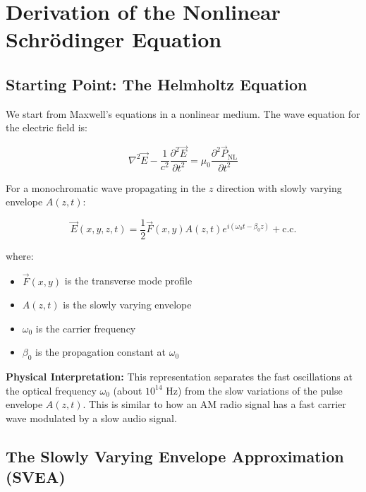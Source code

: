 \documentclass[a4paper, 11pt]{article}
\begin{document}
\section{Derivation of the Nonlinear Schrödinger Equation}

\subsection{Starting Point: The Helmholtz Equation}

We start from Maxwell's equations in a nonlinear medium. The wave equation for the electric field is:

\begin{equation}
    \nabla^2 \vec{E} - \frac{1}{c^2}\frac{\partial^2 \vec{E}}{\partial t^2} = \mu_0 \frac{\partial^2 \vec{P}_{\text{NL}}}{\partial t^2}
    \label{eq:wave_equation_nonlinear}
\end{equation}

For a monochromatic wave propagating in the $z$ direction with slowly varying envelope $A(z,t)$:

\begin{equation}
    \vec{E}(x,y,z,t) = \frac{1}{2}\vec{F}(x,y)A(z,t)e^{i(\omega_0 t - \beta_0 z)} + \text{c.c.}
    \label{eq:field_envelope}
\end{equation}

where:
\begin{itemize}
    \item $\vec{F}(x,y)$ is the transverse mode profile
    \item $A(z,t)$ is the slowly varying envelope
    \item $\omega_0$ is the carrier frequency
    \item $\beta_0$ is the propagation constant at $\omega_0$
\end{itemize}

\begin{physical}
\textbf{Physical Interpretation:} This representation separates the fast oscillations at the optical frequency $\omega_0$ (about $10^{14}$ Hz) from the slow variations of the pulse envelope $A(z,t)$. This is similar to how an AM radio signal has a fast carrier wave modulated by a slow audio signal.
\end{physical}

\subsection{The Slowly Varying Envelope Approximation (SVEA)}
\end{document}
